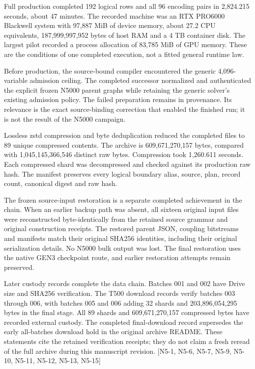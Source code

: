 Full production completed 192 logical rows and all 96 encoding pairs in 2,824.215 seconds, about 47 minutes. The recorded machine was an RTX PRO6000 Blackwell system with 97,887 MiB of device memory, about 27.2 CPU equivalents, 187,999,997,952 bytes of host RAM and a 4 TB container disk. The largest pilot recorded a process allocation of 83,785 MiB of GPU memory. These are the conditions of one completed execution, not a fitted general runtime law.

Before production, the source-bound compiler encountered the generic 4,096-variable admission ceiling. The completed successor normalized and authenticated the explicit frozen N5000 parent graphs while retaining the generic solver's existing admission policy. The failed preparation remains in provenance. Its relevance is the exact source-binding correction that enabled the finished run; it is not the result of the N5000 campaign.

Lossless zstd compression and byte deduplication reduced the completed files to 89 unique compressed contents. The archive is 609,671,270,157 bytes, compared with 1,045,145,366,546 distinct raw bytes. Compression took 1,260.611 seconds. Each compressed shard was decompressed and checked against its production raw hash. The manifest preserves every logical boundary alias, source, plan, record count, canonical digest and raw hash.

The frozen source-input restoration is a separate completed achievement in the chain. When an earlier backup path was absent, all sixteen original input files were reconstructed byte-identically from the retained source grammar and original construction receipts. The restored parent JSON, coupling bitstreams and manifests match their original SHA256 identities, including their original serialization details. No N5000 bulk output was lost. The final restoration uses the native GEN3 checkpoint route, and earlier restoration attempts remain preserved.

Later custody records complete the data chain. Batches 001 and 002 have Drive size and SHA256 verification. The T500 download records verify batches 003 through 006, with batches 005 and 006 adding 32 shards and 203,896,054,295 bytes in the final stage. All 89 shards and 609,671,270,157 compressed bytes have recorded external custody. The completed final-download record supersedes the early all-batches download hold in the original archive README. These statements cite the retained verification receipts; they do not claim a fresh reread of the full archive during this manuscript revision. {[}N5-1, N5-6, N5-7, N5-9, N5-10, N5-11, N5-12, N5-13, N5-15{]}

